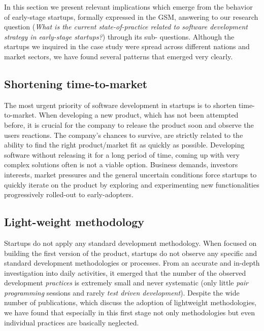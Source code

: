 \documentclass[10pt,journal,letterpaper,compsoc]{IEEEtran}
\begin{document}
In this section we present relevant implications which  emerge from the behavior
of early-stage startups, formally expressed in the GSM,  answering to our
research question (\textit{What is the current  state-of-practice related to
software development strategy in early-stage  startups?}) through its sub-
questions. Although the startups we inquired in the  case study were spread
across different nations and market sectors, we have  found several patterns
that emerged very clearly.

\subsection{Shortening time-to-market}

The most urgent priority of software development in startups is to shorten
time-to-market. When developing a new product, which has not been attempted
before, it is crucial for the company to release the product soon and observe
the users reactions. The company's chances to survive, are strictly related to
the ability to find the right product/market fit as quickly as possible.
Developing software without releasing it for a long period of time, coming up
with very complex solutions often is not a viable option. Business demands,
investors interests, market pressures and the general uncertain conditions force
startups to quickly iterate on the product by exploring and experimenting new
functionalities progressively rolled-out to early-adopters. 



\subsection{Light-weight methodology} 
Startups do not apply any standard development methodology. When focused  on 
building the first version of the product, startups do not observe any  
specific and standard development methodologies or processes.  From an accurate 
and in-depth investigation into daily activities, it emerged that the number of 
the observed development \textit{practices} is extremely small and never  
systematic (only little \textit{pair programming} sessions and rarely  
\textit{test driven development}). Despite the wide number of publications,  
which discuss the adoption of lightweight methodologies, we have found that  
especially in this first stage not only methodologies but even individual  
practices are basically neglected.
\end{document}
